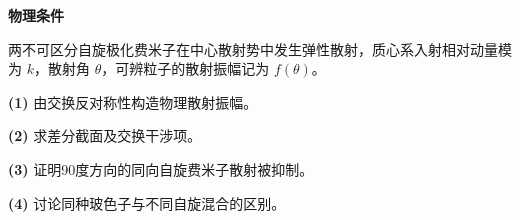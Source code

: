 \textbf{物理条件}\par 两不可区分自旋极化费米子在中心散射势中发生弹性散射，质心系入射相对动量模为 \(k\)，散射角 \(\theta\)，可辨粒子的散射振幅记为 \(f(\theta)\)。
\par\noindent\textbf{(1)} 由交换反对称性构造物理散射振幅。
\par\noindent\textbf{(2)} 求差分截面及交换干涉项。
\par\noindent\textbf{(3)} 证明90度方向的同向自旋费米子散射被抑制。
\par\noindent\textbf{(4)} 讨论同种玻色子与不同自旋混合的区别。
